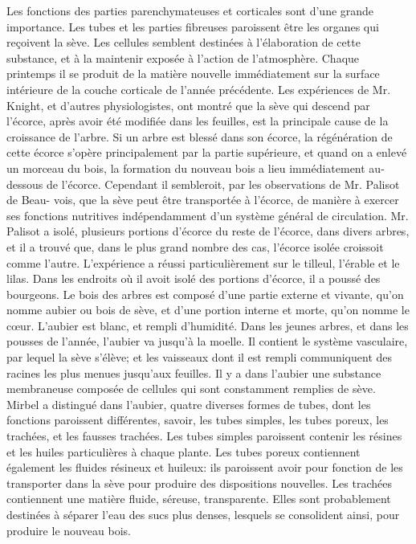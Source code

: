 Les fonctions des parties parenchymateuses et corticales sont d'une grande importance. Les tubes et les parties fibreuses paroissent être les organes qui reçoivent la sève. Les cellules semblent destinées à l'élaboration de cette substance, et à la maintenir exposée à l'action de l'atmosphère. Chaque printemps il se produit de la matière nouvelle immédiatement sur la surface intérieure de la couche corticale de l'année précédente.
Les expériences de Mr. Knight, et d'autres physiologistes, ont montré que la sève qui descend par l'écorce, après avoir été modifiée dans les feuilles, est la principale cause de la croissance de l'arbre. Si un arbre est blessé dans son écorce, la régénération de cette écorce s'opère principalement par la partie supérieure, et quand on a enlevé un morceau du bois, la formation du nouveau bois a lieu immédiatement au-dessous de l'écorce. Cependant il sembleroit, par les observations de Mr. Palisot de Beau-\setcounter{page}{378} vois, que la sève peut être transportée à l'écorce, de manière à exercer ses fonctions nutritives indépendamment d'un système général de circulation. Mr. Palisot a isolé, plusieurs portions d'écorce du reste de l'écorce, dans divers arbres, et il a trouvé que, dans le plus grand nombre des cas, l'écorce isolée croissoit comme l'autre. L'expérience a réussi particulièrement sur le tilleul, l'érable et le lilas. Dans les endroits où il avoit isolé des portions d'écorce, il a poussé des bourgeons.
Le bois des arbres est composé d'une partie externe et vivante, qu'on nomme aubier ou bois de sève, et d'une portion interne et morte, qu'on nomme le cœur. L'aubier est blanc, et rempli d'humidité. Dans les jeunes arbres, et dans les pousses de l'année, l'aubier va jusqu'à la moelle. Il contient le système vasculaire, par lequel la sève s'élève; et les vaisseaux dont il est rempli communiquent des racines les plus menues jusqu'aux feuilles.
Il y a dans l'aubier une substance membraneuse composée de cellules qui sont constamment remplies de sève. Mirbel a distingué dans l'aubier, quatre diverses formes de tubes, dont les fonctions paroissent différentes, savoir, les tubes simples, les tubes\setcounter{page}{379} poreux, les trachées, et les fausses trachées.
Les tubes simples paroissent contenir les résines et les huiles particulières à chaque plante.
Les tubes poreux contiennent également les fluides résineux et huileux: ils paroissent avoir pour fonction de les transporter dans la sève pour produire des dispositions nouvelles.
Les trachées contiennent une matière fluide, séreuse, transparente. Elles sont probablement destinées à séparer l'eau des sucs plus denses, lesquels se consolident ainsi, pour produire le nouveau bois.
